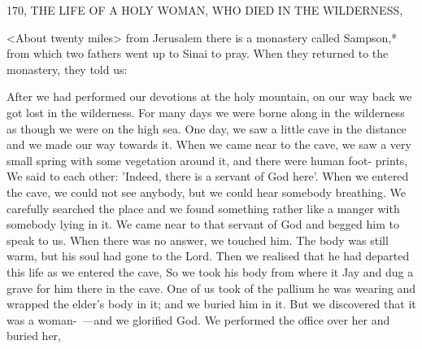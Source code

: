 170, THE LIFE OF A HOLY WOMAN,
WHO DIED IN THE WILDERNESS,

<About twenty miles> from Jerusalem there is a monastery called
Sampson,* from which two fathers went up to Sinai to pray. When
they returned to the monastery, they told us:

After we had performed our devotions at the holy mountain, on our
way back we got lost in the wilderness. For many days we were
borne along in the wilderness as though we were on the high sea.
One day, we saw a little cave in the distance and we made our way
towards it. When we came near to the cave, we saw a very small
spring with some vegetation around it, and there were human foot-
prints, We said to each other: 'Indeed, there is a servant of God
here'. When we entered the cave, we could not see anybody, but we
could hear somebody breathing. We carefully searched the place and
we found something rather like a manger with somebody lying in it.
We came near to that servant of God and begged him to speak to
us. When there was no answer, we touched him. The body was still
warm, but his soul had gone to the Lord. Then we realised that he
had departed this life as we entered the cave, So we took his body
from where it Jay and dug a grave for him there in the cave. One of
us took of the pallium he was wearing and wrapped the elder's body
in it; and we buried him in it. But we discovered that it was a
woman-~—and we glorified God. We performed the office over her
and buried her,

